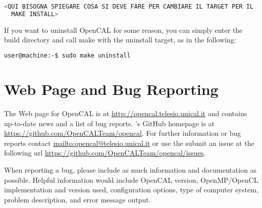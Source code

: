 \begin{lstlisting}[numbers=none,language=bash,label={ch:quickstart:sudoinstall}]
  <QUI BISOGNA SPIEGARE COSA SI DEVE FARE PER CAMBIARE IL TARGET PER IL
  MAKE INSTALL>
\end{lstlisting}

If you want to uninstall OpenCAL for some reason, you can simply enter the build directory and call make with the uninstall target, as in the following:

\begin{lstlisting}[numbers=none,language=bash,label={ch:quickstart:sudouninstall}]
  user@machine:-$ sudo make uninstall
\end{lstlisting}

\section{Web Page and Bug Reporting}

The Web page for OpenCAL is at \url{http://opencal.telesio.unical.it} and
contains up-to-date news and a list of bug reports. \ocal's GitHub
homepage is at \url{https://github.com/OpenCALTeam/opencal}. For
further information or bug reports contact
\url{mailto:opencal@telesio.unical.it} or use the submit an issue at the
following url \url{https://github.com/OpenCALTeam/opencal/issues}.

When reporting a bug, please include as much information and
documentation as possible. Helpful information would include OpenCAL
version, OpenMP/OpenCL implementation and version used,
configuration options, type of computer system, problem description,
and error message output.
